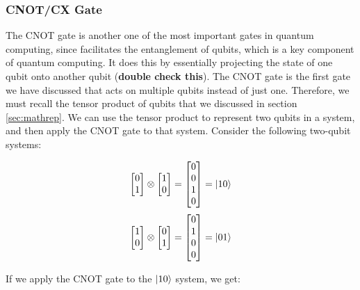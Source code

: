 \documentclass{article}
\begin{document}
\subsubsection{CNOT/CX Gate}
\label{sec:cnotgate}

The CNOT gate is another one of the most important gates in quantum computing, since facilitates the entanglement of qubits, which is a key component of quantum computing. It does
this by essentially projecting the state of one qubit onto another qubit (\textbf{double check this}). The CNOT gate is the first gate we have discussed that acts on multiple
qubits instead of just one. Therefore, we must recall the tensor product of qubits that we discussed in section \ref{sec:mathrep}. We can use the tensor product to represent 
two qubits in a system, and then apply the CNOT gate to that system. Consider the following two-qubit systems:

\[
	\begin{bmatrix}
		0 \\
		1 \\
	\end{bmatrix}
	\otimes
	\begin{bmatrix}
		1 \\
		0 \\
	\end{bmatrix}
	=
	\begin{bmatrix}
		0 \\
		0 \\
		1 \\
		0 \\
	\end{bmatrix}
	=
	\ket{10}
\]
\[
	\begin{bmatrix}
		1 \\
		0 \\
	\end{bmatrix}
	\otimes
	\begin{bmatrix}
		0 \\
		1 \\
	\end{bmatrix}
	=
	\begin{bmatrix}
		0 \\
		1 \\
		0 \\
		0 \\
	\end{bmatrix}
	=
	\ket{01}
\]

If we apply the CNOT gate to the $\ket{10}$ system, we get:
\end{document}
